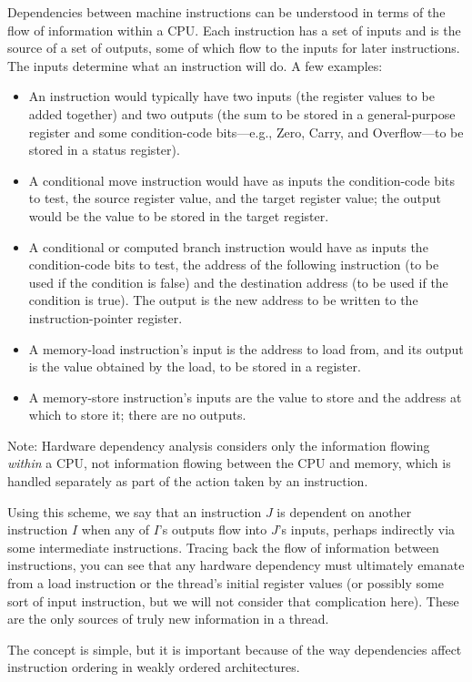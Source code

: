 \documentclass[10]{article}
\begin{document}
Dependencies between machine instructions can be understood in terms
of the flow of information within a CPU.
Each instruction has a set of inputs and is the source of a set of outputs,
some of which flow to the inputs for later instructions.
The inputs determine what an instruction will do.
A few examples:
\begin{itemize}
\item	An  instruction would typically have two inputs
	(the register values to be added together) and two outputs
	(the sum to be stored in a general-purpose register and some
	condition-code bits---e.g., Zero, Carry, and Overflow---to be
	stored in a status register).
\item	A conditional move instruction would have as inputs the
	condition-code bits to test, the source register value, and the
	target register value; the output would be the value to be stored
	in the target register.
\item	A conditional or computed branch instruction would have as inputs
	the condition-code bits to test, the address of the following
	instruction (to be used if the condition is false) and the
	destination address (to be used if the condition is true).
	The output is the new address to be written to the
	instruction-pointer register.
\item	A memory-load instruction's input is the address to load from,
	and its output is the value obtained by the load, to be stored
	in a register.
\item	A memory-store instruction's inputs are the value to store and
	the address at which to store it; there are no outputs.
\end{itemize}
Note: Hardware dependency analysis considers only the information
flowing \emph{within} a CPU, not information flowing between the
CPU and memory, which is handled separately as part of the action
taken by an instruction.

Using this scheme, we say that an instruction $J$ is dependent on
another instruction $I$ when any of $I$'s outputs flow into $J$'s inputs,
perhaps indirectly via some intermediate instructions.
Tracing back the flow of information between instructions, you can
see that any hardware dependency must ultimately emanate from a load
instruction or the thread's initial register values (or possibly some sort of
input instruction, but we will not consider that complication here).
These are the only sources of truly new information in a thread.

The concept is simple, but it is important because of the way
dependencies affect instruction ordering in weakly ordered architectures.
\end{document}
